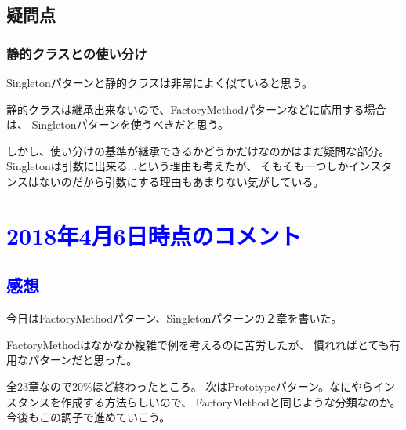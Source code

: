 \documentclass[11pt]{jsarticle}
\begin{document}
		\color{red}
		\subsection{疑問点}
			\subsubsection{静的クラスとの使い分け}
				Singletonパターンと静的クラスは非常によく似ていると思う。
				
				静的クラスは継承出来ないので、FactoryMethodパターンなどに応用する場合は、
				Singletonパターンを使うべきだと思う。
				
				しかし、使い分けの基準が継承できるかどうかだけなのかはまだ疑問な部分。
				Singletonは引数に出来る...という理由も考えたが、
				そもそも一つしかインスタンスはないのだから引数にする理由もあまりない気がしている。
		\color{black}
			
		\section*{\textcolor{blue}{2018年4月6日時点のコメント}}
			\subsection*{\textcolor{blue}{感想}}
			今日はFactoryMethodパターン、Singletonパターンの２章を書いた。
			
			FactoryMethodはなかなか複雑で例を考えるのに苦労したが、
			慣れればとても有用なパターンだと思った。
			
			全23章なので$20\%$ほど終わったところ。
			次はPrototypeパターン。なにやらインスタンスを作成する方法らしいので、
			FactoryMethodと同じような分類なのか。
			今後もこの調子で進めていこう。
			\clearpage	
			
			
			
			
			
			
			
			
		
\end{document}
